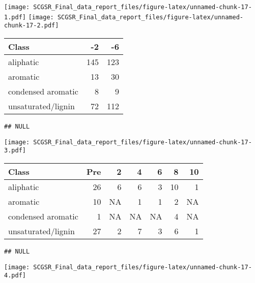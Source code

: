\documentclass[
]{article}
\begin{document}
\texttt{[image: SCGSR\_Final\_data\_report\_files/figure-latex/unnamed-chunk-17-1.pdf]}
\texttt{[image: SCGSR\_Final\_data\_report\_files/figure-latex/unnamed-chunk-17-2.pdf]}

\begin{longtable}[]{@{}lrr@{}}
\toprule()
Class & -2 & -6 \\
\midrule()
\endhead
aliphatic & 145 & 123 \\
aromatic & 13 & 30 \\
condensed aromatic & 8 & 9 \\
unsaturated/lignin & 72 & 112 \\
\bottomrule()
\end{longtable}

\begin{verbatim}
## NULL
\end{verbatim}

\texttt{[image: SCGSR\_Final\_data\_report\_files/figure-latex/unnamed-chunk-17-3.pdf]}

\begin{longtable}[]{@{}lrrrrrr@{}}
\toprule()
Class & Pre & 2 & 4 & 6 & 8 & 10 \\
\midrule()
\endhead
aliphatic & 26 & 6 & 6 & 3 & 10 & 1 \\
aromatic & 10 & NA & 1 & 1 & 2 & NA \\
condensed aromatic & 1 & NA & NA & NA & 4 & NA \\
unsaturated/lignin & 27 & 2 & 7 & 3 & 6 & 1 \\
\bottomrule()
\end{longtable}

\begin{verbatim}
## NULL
\end{verbatim}

\texttt{[image: SCGSR\_Final\_data\_report\_files/figure-latex/unnamed-chunk-17-4.pdf]}
\end{document}
